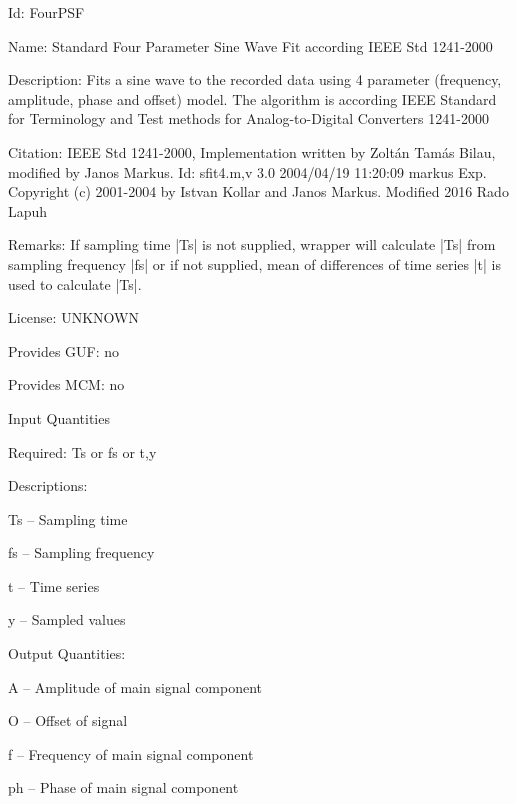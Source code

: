 \begin{tightdesc}
\item [Id:] FourPSF
\item [Name:] Standard Four Parameter Sine Wave Fit according IEEE Std 1241-2000
\item [Description:] Fits a sine wave to the recorded data using 4 parameter (frequency, amplitude, phase and offset) model. The algorithm is according IEEE Standard for Terminology and Test methods for Analog-to-Digital Converters 1241-2000
\item [Citation:] IEEE Std 1241-2000, Implementation written by Zoltán Tamás Bilau, modified by Janos Markus. Id: sfit4.m,v 3.0 2004/04/19 11:20:09 markus Exp. Copyright (c) 2001-2004 by Istvan Kollar and Janos Markus. Modified 2016 Rado Lapuh
\item [Remarks:] If sampling time |Ts| is not supplied, wrapper will calculate |Ts| from sampling frequency |fs| or if not supplied, mean of differences of time series |t| is used to calculate |Ts|.
\item [License:] UNKNOWN
\item [Provides GUF:] no
\item [Provides MCM:] no
\item [Input Quantities] \rule{0em}{0em}
    \begin{tightdesc}
    \item [Required:] 
        \textsf{Ts} or \textsf{fs} or \textsf{t},\enspace \textsf{y}
    \item [Descriptions:] \rule{0em}{0em}
        \begin{tightdesc}
            \item[\textsf{Ts}] -- Sampling time
            \item[\textsf{fs}] -- Sampling frequency
            \item[\textsf{t}] -- Time series
            \item[\textsf{y}] -- Sampled values
        \end{tightdesc}
    \end{tightdesc}
\item [Output Quantities:] \rule{0em}{0em}
    \begin{tightdesc}
        \item[\textsf{A}] -- Amplitude of main signal component
        \item[\textsf{O}] -- Offset of signal
        \item[\textsf{f}] -- Frequency of main signal component
        \item[\textsf{ph}] -- Phase of main signal component
    \end{tightdesc}
\end{tightdesc}
